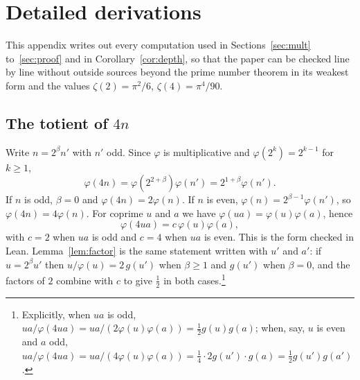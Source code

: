 \documentclass{amsart}
\theoremstyle{definition}
\theoremstyle{remark}
\numberwithin{equation}{section}
\begin{document}
\section{Detailed derivations}\label{app:derivations}

This appendix writes out every computation used in Sections~\ref{sec:mult} to~\ref{sec:proof} and in Corollary~\ref{cor:depth}, so that the paper can be checked line by line without outside sources beyond the prime number theorem in its weakest form and the values $\zeta(2)=\pi^2/6$, $\zeta(4)=\pi^4/90$.

\subsection{The totient of \texorpdfstring{$4n$}{4n}}\label{app:totient}
\enlargethispage{4pt}
Write $n=2^\beta n'$ with $n'$ odd. Since $\varphi$ is multiplicative and $\varphi(2^k)=2^{k-1}$ for $k\ge1$,
\[
\varphi(4n)=\varphi(2^{2+\beta})\varphi(n')=2^{1+\beta}\varphi(n').
\]
If $n$ is odd, $\beta=0$ and $\varphi(4n)=2\varphi(n)$. If $n$ is even, $\varphi(n)=2^{\beta-1}\varphi(n')$, so $\varphi(4n)=4\varphi(n)$. For coprime $u$ and $a$ we have $\varphi(ua)=\varphi(u)\varphi(a)$, hence
\[
\varphi(4ua)=c\,\varphi(u)\varphi(a),
\]
with $c=2$ when $ua$ is odd and $c=4$ when $ua$ is even.
This is the form checked in Lean. Lemma~\ref{lem:factor} is the same statement written with $u'$ and $a'$: if $u=2^\beta u'$ then $u/\varphi(u)=2\,g(u')$ when $\beta\ge1$ and $g(u')$ when $\beta=0$, and the factors of $2$ combine with $c$ to give $\frac12$ in both cases.\footnote{Explicitly, when $ua$ is odd, $ua/\varphi(4ua)=ua/(2\varphi(u)\varphi(a))=\frac12g(u)g(a)$; when, say, $u$ is even and $a$ odd, $ua/\varphi(4ua)=ua/(4\varphi(u)\varphi(a))=\frac14\cdot2g(u')\cdot g(a)=\frac12g(u')g(a')$.}
\end{document}
